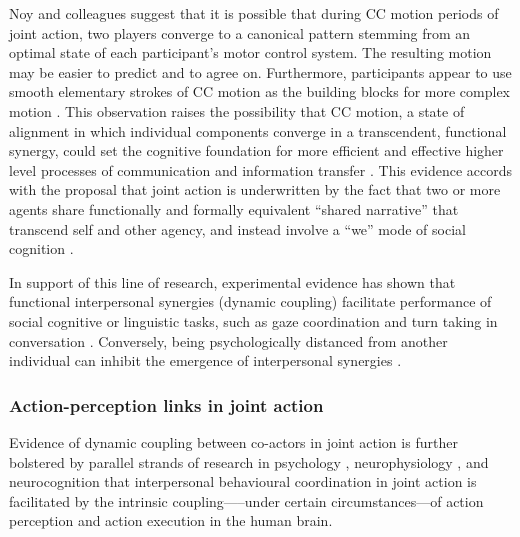 Noy and colleagues suggest that it is possible that during CC motion periods of joint action, two players converge to a canonical pattern stemming from an optimal state of each participant’s motor control system.  The resulting motion may be easier to predict and to agree on. Furthermore, participants appear to use smooth elementary strokes of CC motion as the building blocks for more complex motion \citep{Noy2017}.  This observation raises the possibility that CC motion, a state of alignment in which individual components converge in a transcendent, functional synergy, could set the cognitive foundation for more efficient and effective higher level processes of communication and information transfer \citep[15]{Lerique2016}.  This evidence accords with the proposal that joint action is underwritten by the fact that two or more agents share functionally and formally equivalent ``shared narrative'' that transcend self and other agency, and instead involve a ``we'' mode of social cognition \citep{Gallotti2013}.

In support of this line of research, experimental evidence has shown that functional interpersonal synergies (dynamic coupling) facilitate performance of social cognitive or linguistic tasks, such as gaze coordination and turn taking in conversation \citep{Miles2010,Richardson2005,Shockley2009}.  Conversely, being psychologically distanced from another individual can inhibit the emergence of interpersonal synergies \citep{Miles2010}.



\subsubsection{Action-perception links in joint action\label{app2:actionPerceptionLinks}}

Evidence of dynamic coupling between co-actors in joint action is further bolstered by parallel strands of research in psychology \citep{Prinz1990,Prinz1997,Prinz2013}, neurophysiology \citep{Rizzolatti2004,Rizzolatti2010}, and neurocognition \citep{Wolpert1998,Wolpert2000} that interpersonal behavioural coordination in joint action is facilitated by the intrinsic coupling—--under certain circumstances---of action perception and action execution in the human brain.

